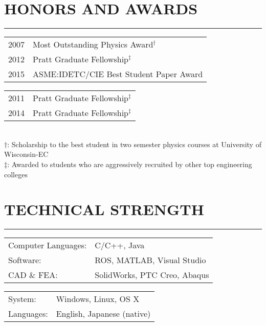 \documentclass[11pt,letterpaper]{article}
\begin{document}
\section*{HONORS AND AWARDS}\vspace{-3mm}
\hrule
\hspace{0mm}
\begin{minipage}{\columnwidth}
\begin{minipage}{0.5\columnwidth}
\begin{tabular}{l l}
2007 & Most Outstanding Physics Award$^\dagger$ \\
2012 & Pratt Graduate Fellowship$^\ddagger$\\
2015 & ASME:IDETC/CIE Best Student Paper Award\\
\end{tabular}
\end{minipage}
\hfill
\begin{minipage}{0.4\columnwidth}
\begin{tabular}{l l}
2011 & Pratt Graduate Fellowship$^\ddagger$ \\
2014 & Pratt Graduate Fellowship$^\ddagger$\\ 
\end{tabular}
\end{minipage}
\\
\vspace{5mm}
$\dagger$: Scholarship to the best student in two semester physics courses at University of Wisconsin-EC\\
$\ddagger$: Awarded to students who are aggressively recruited by other top engineering colleges\\
\end{minipage}

\section*{TECHNICAL STRENGTH}\vspace{-3mm}
\hrule

\begin{minipage}{0.58\columnwidth}
\begin{tabular}{ll}
Computer Languages:& C/C++, Java\\
Software:& ROS, MATLAB, Visual Studio \\
CAD \& FEA:& SolidWorks, PTC Creo, Abaqus\\
\end{tabular}
\end{minipage}
\begin{minipage}{0.35\columnwidth}
\begin{tabular}{ll}
System: & Windows, Linux, OS X\\
Languages: & English, Japanese (native)\\
\end{tabular}
\end{minipage}
\end{document}
